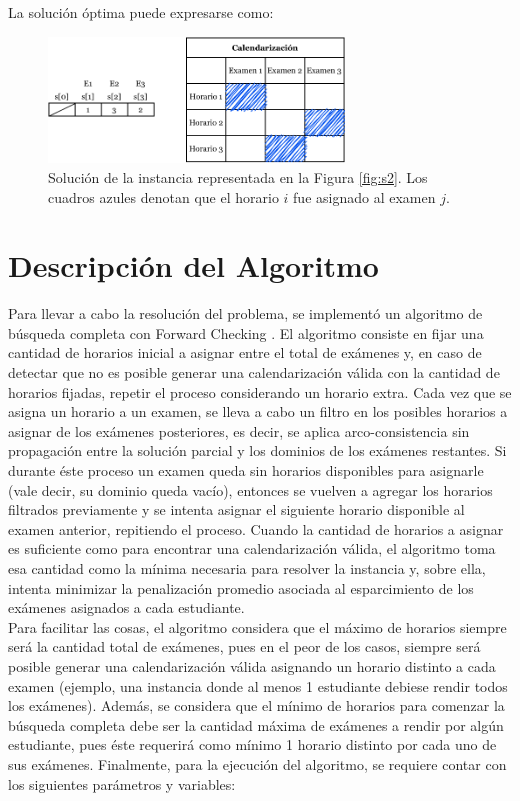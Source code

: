 \documentclass[letter, 10pt]{article}
\begin{document}
La solución óptima puede expresarse como:

\begin{figure}[H]
\begin{center}
\includegraphics[width=0.7\textwidth]{img/s4.pdf}
\end{center}
\caption{Solución de la instancia representada en la Figura \ref{fig:s2}. Los cuadros azules denotan que el horario $i$ fue asignado al examen $j$.}
\label{fig:s3}
\end{figure}

\section{Descripción del Algoritmo} \label{algoritmo}

Para llevar a cabo la resolución del problema, se implementó un algoritmo de búsqueda completa con Forward Checking \cite{forwardchecking}. El algoritmo consiste en fijar una cantidad de horarios inicial a asignar entre el total de exámenes y, en caso de detectar que no es posible generar una calendarización válida con la cantidad de horarios fijadas, repetir el proceso considerando un horario extra. Cada vez que se asigna un horario a un examen, se lleva a cabo un filtro en los posibles horarios a asignar de los exámenes posteriores, es decir, se aplica arco-consistencia sin propagación entre la solución parcial y los dominios de los exámenes restantes. Si durante éste proceso un examen queda sin horarios disponibles para asignarle (vale decir, su dominio queda vacío), entonces se vuelven a agregar los horarios filtrados previamente y se intenta asignar el siguiente horario disponible al examen anterior, repitiendo el proceso. Cuando la cantidad de horarios a asignar es suficiente como para encontrar una calendarización válida, el algoritmo toma esa cantidad como la mínima necesaria para resolver la instancia y, sobre ella, intenta minimizar la penalización promedio asociada al esparcimiento de los exámenes asignados a cada estudiante.\\

Para facilitar las cosas, el algoritmo considera que el máximo de horarios siempre será la cantidad total de exámenes, pues en el peor de los casos, siempre será posible generar una calendarización válida asignando un horario distinto a cada examen (ejemplo, una instancia donde al menos 1 estudiante debiese rendir todos los exámenes). Además, se considera que el mínimo de horarios para comenzar la búsqueda completa debe ser la cantidad máxima de exámenes a rendir por algún estudiante, pues éste requerirá como mínimo 1 horario distinto por cada uno de sus exámenes. Finalmente, para la ejecución del algoritmo, se requiere contar con los siguientes parámetros y variables:
\end{document}
